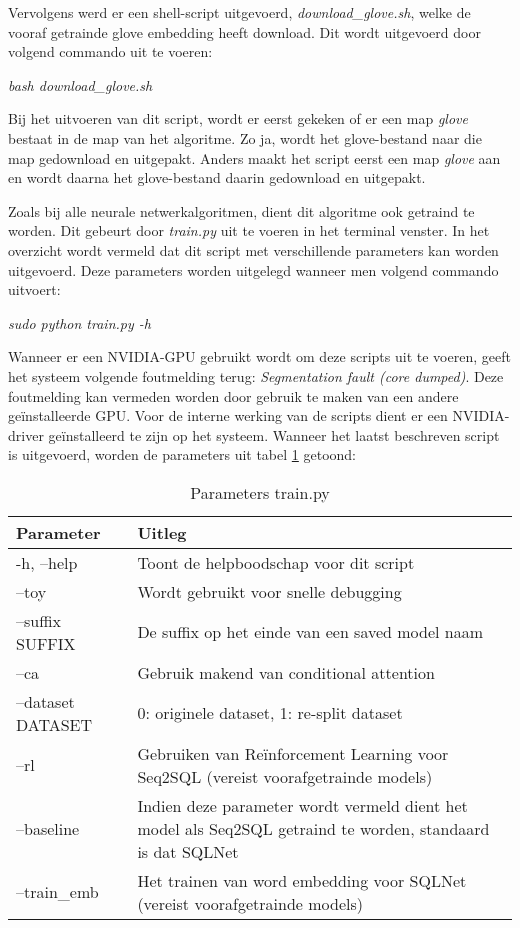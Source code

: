 Vervolgens werd er een shell-script uitgevoerd, \textit{download\_glove.sh}, welke de vooraf getrainde glove embedding heeft download. Dit wordt uitgevoerd door volgend commando uit te voeren:

\begin{center}
	\textit{bash download\_glove.sh}
\end{center}

Bij het uitvoeren van dit script, wordt er eerst gekeken of er een map \textit{glove} bestaat in de map van het algoritme. Zo ja, wordt het glove-bestand naar die map gedownload en uitgepakt. Anders maakt het script eerst een map \textit{glove} aan en wordt daarna het glove-bestand daarin gedownload en uitgepakt. 

Zoals bij alle neurale netwerkalgoritmen, dient dit algoritme ook getraind te worden. Dit gebeurt door \textit{train.py} uit te voeren in het terminal venster. In het overzicht wordt vermeld dat dit script met verschillende parameters kan worden uitgevoerd. Deze parameters worden uitgelegd wanneer men volgend commando uitvoert:

\begin{center}
	\textit{sudo python train.py -h}
\end{center}

Wanneer er een NVIDIA-GPU gebruikt wordt om deze scripts uit te voeren, geeft het systeem volgende foutmelding terug: \textit{Segmentation fault (core dumped)}. Deze foutmelding kan vermeden worden door gebruik te maken van een andere geïnstalleerde GPU. Voor de interne werking van de scripts dient er een NVIDIA-driver geïnstalleerd te zijn op het systeem. Wanneer het laatst beschreven script is uitgevoerd, worden de parameters uit tabel \ref{table:paramtrain} getoond:

\begin{table}[htb]
	\centering
	\begin{tabular}{ | l | p{5cm} |}
		\hline
		Parameter 			& Uitleg \\ \hline
		-h, --help 			& Toont de helpboodschap voor dit script \\ \hline
		--toy 				& Wordt gebruikt voor snelle debugging \\ \hline
		--suffix SUFFIX		& De suffix op het einde van een saved model naam \\ \hline
		--ca				& Gebruik makend van conditional attention \\ \hline
		--dataset DATASET 	& 0: originele dataset, 1: re-split dataset \\ \hline
		--rl				& Gebruiken van Reïnforcement Learning voor Seq2SQL (vereist voorafgetrainde models) \\ \hline
		--baseline			& Indien deze parameter wordt vermeld dient het model als Seq2SQL getraind te worden, standaard is dat SQLNet \\ \hline
		--train\_emb		& Het trainen van word embedding voor SQLNet (vereist voorafgetrainde models) \\ \hline	 
	\end{tabular}
	\caption{Parameters train.py}
	\label{table:paramtrain}
\end{table}

